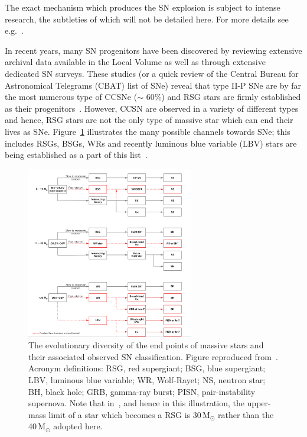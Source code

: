 The exact mechanism which produces the SN explosion is subject to intense research, the subtleties of which will not be detailed here.
For more details see e.g.~\cite{Janka12, Burrows13,2015PASA...32....9F}.

In recent years, many SN progenitors have been discovered by reviewing extensive archival data available in the Local Volume as well as through extensive dedicated SN surveys.
These studies (or a quick review of the Central Bureau for Astronomical Telegrams (CBAT) list of SNe\footnotemark) reveal that type II-P SNe are by far the most numerous type of CCSNe ($\sim$ 60\%) and RSG stars are firmly established as their progenitors~\citep[][and references therein]{Smartt09}.
However, CCSN are observed in a variety of different types and hence, RSG stars are not the only type of massive star which can end their lives as SNe.
Figure~\ref{fig:SNe-Smartt} illustrates the many possible channels towards SNe; this includes RSGs, BSGs, WRs and recently luminous blue variable (LBV) stars are being established as a part of this list~\citep[e.g.][]{Smartt09, Groh13}.

 \begin{figure}
 \centering
 \includegraphics[width=0.65\textwidth]{intro/Smartt09fig12}
 \caption[Endpoints of massive stars]{The evolutionary diversity of the end points of massive stars and their associated observed SN classification. Figure reproduced from~\cite{Smartt09}. Acronym definitions: RSG, red supergiant; BSG, blue supergiant; LBV, luminous blue variable; WR, Wolf-Rayet; NS, neutron star; BH, black hole; GRB, gamma-ray burst; PISN, pair-instability supernova.
 Note that in~\citet{Smartt09}, and hence in this illustration, the upper-mass limit of a star which becomes a RSG is 30\,M$_{\odot}$ rather than the 40\,M$_{\odot}$ adopted here.
 \label{fig:SNe-Smartt}}
\end{figure}

